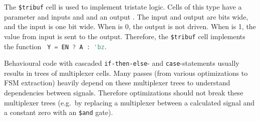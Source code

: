 The {\tt \$tribuf} cell is used to implement tristate logic. Cells of this type have a 
parameter and inputs  and  and an output . The  input and  output are
 bits wide, and the  input is one bit wide. When  is 0, the output 
is not driven. When  is 1, the value from  input is sent to the  output. Therefore,
the {\tt \$tribuf} cell implements the function \lstinline[language=Verilog]; Y = EN ? A : 'bz;.

Behavioural code with cascaded {\tt if-then-else}- and {\tt case}-statements
usually results in trees of multiplexer cells. Many passes (from various
optimizations to FSM extraction) heavily depend on these multiplexer trees to
understand dependencies between signals. Therefore optimizations should not
break these multiplexer trees (e.g.~by replacing a multiplexer between a
calculated signal and a constant zero with an {\tt \$and} gate).


